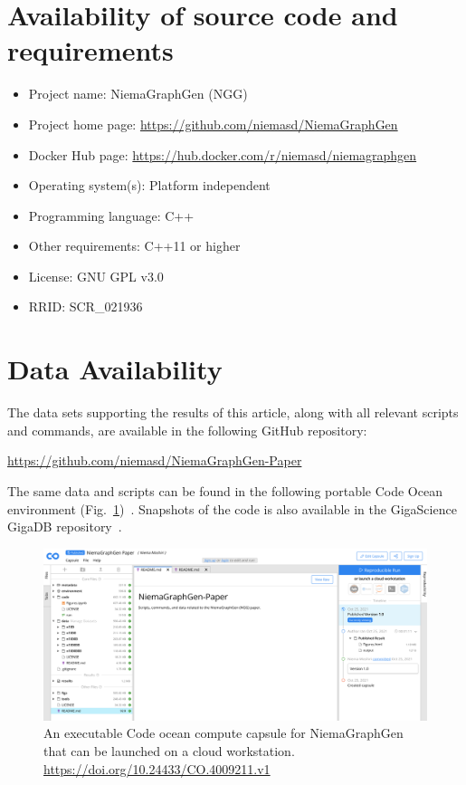 \documentclass[a4paper,num-refs,gigabyte]{oup-contemporary}
\begin{document}
\section{Availability of source code and requirements}

\begin{itemize}
\item Project name: NiemaGraphGen (NGG)
\item Project home page: \url{https://github.com/niemasd/NiemaGraphGen}
\item Docker Hub page: \url{https://hub.docker.com/r/niemasd/niemagraphgen}
\item Operating system(s): Platform independent
\item Programming language: C++
\item Other requirements: C++11 or higher
\item License: GNU GPL v3.0
\item RRID: SCR\_021936
\end{itemize}

\section{Data Availability}

The data sets supporting the results of this article, along with all relevant scripts and commands, are available in the following GitHub repository:

\url{https://github.com/niemasd/NiemaGraphGen-Paper}

The same data and scripts can be found in the following portable Code Ocean environment (Fig.~\ref{fig:code-ocean})~\cite{NGGCodeOcean}. Snapshots of the code is also available in the GigaScience GigaDB repository~\cite{NGGGigaDB}.

\begin{figure}[h]%
\centering
\includegraphics[width=\textwidth]{Fig2}
\caption{An executable Code ocean compute capsule for NiemaGraphGen that can be launched on a cloud workstation. \url{https://doi.org/10.24433/CO.4009211.v1}}\label{fig:code-ocean}
\end{figure}
\end{document}
